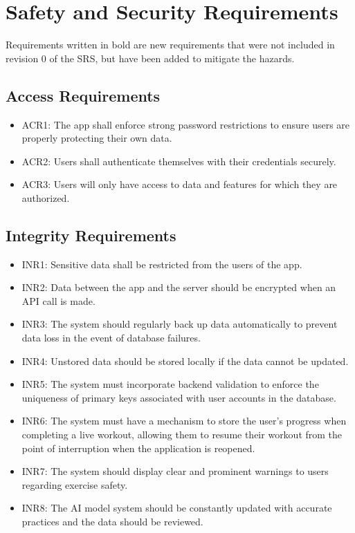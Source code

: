 \documentclass{article}
\begin{document}
\section{Safety and Security Requirements}

Requirements written in bold are new requirements that were not included in revision 0 of the SRS, but have been added to mitigate the hazards.

\subsection{Access Requirements}
\begin{itemize}
    \item ACR1: The app shall enforce strong password restrictions to ensure users are properly protecting their own data.
    \item ACR2: Users shall authenticate themselves with their credentials securely.
    \item ACR3: Users will only have access to data and features for which they are authorized.
\end{itemize}

\subsection{Integrity Requirements}
\begin{itemize}
    \item INR1: Sensitive data shall be restricted from the users of the app.
    \item INR2: Data between the app and the server should be encrypted when an API call is made.
    \item INR3: The system should regularly back up data automatically to prevent data loss in the event of database failures.
    \item INR4: Unstored data should be stored locally if the data cannot be updated.
    \item INR5: The system must incorporate backend validation to enforce the uniqueness of primary keys associated with user accounts in the database.
    \item INR6: The system must have a mechanism to store the user's progress when completing a live workout, allowing them to resume their workout from the point of interruption when the application is reopened.
    \item INR7: The system should display clear and prominent warnings to users regarding exercise safety.
    \item INR8: The AI model system should be constantly updated with accurate practices and the data should be reviewed.
\end{itemize}
\end{document}
